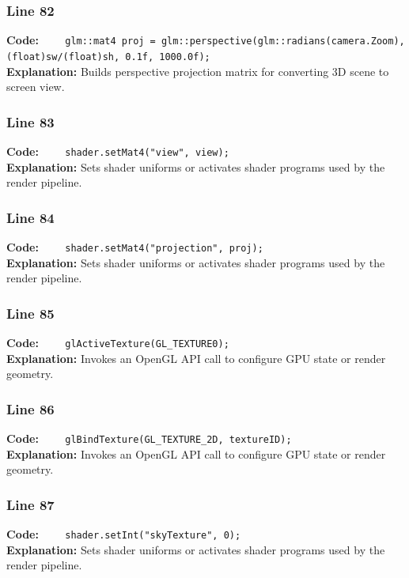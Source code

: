 \documentclass[11pt,a4paper]{article}
\begin{document}
\subsubsection*{Line 82}
\textbf{Code:} \verb|    glm::mat4 proj = glm::perspective(glm::radians(camera.Zoom), (float)sw/(float)sh, 0.1f, 1000.0f);|\\
\textbf{Explanation:} Builds perspective projection matrix for converting 3D scene to screen view.

\subsubsection*{Line 83}
\textbf{Code:} \verb|    shader.setMat4("view", view);|\\
\textbf{Explanation:} Sets shader uniforms or activates shader programs used by the render pipeline.

\subsubsection*{Line 84}
\textbf{Code:} \verb|    shader.setMat4("projection", proj);|\\
\textbf{Explanation:} Sets shader uniforms or activates shader programs used by the render pipeline.

\subsubsection*{Line 85}
\textbf{Code:} \verb|    glActiveTexture(GL_TEXTURE0);|\\
\textbf{Explanation:} Invokes an OpenGL API call to configure GPU state or render geometry.

\subsubsection*{Line 86}
\textbf{Code:} \verb|    glBindTexture(GL_TEXTURE_2D, textureID);|\\
\textbf{Explanation:} Invokes an OpenGL API call to configure GPU state or render geometry.

\subsubsection*{Line 87}
\textbf{Code:} \verb|    shader.setInt("skyTexture", 0);|\\
\textbf{Explanation:} Sets shader uniforms or activates shader programs used by the render pipeline.
\end{document}
